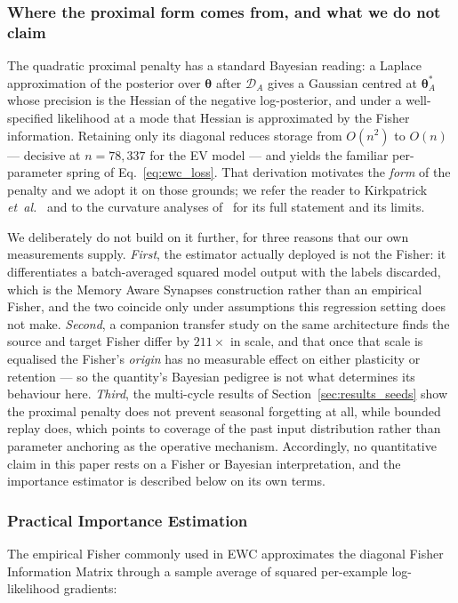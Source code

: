 \documentclass[journal]{IEEEtran}
\newcommand{\params}{\bm{\theta}}
\begin{document}
\subsubsection{Where the proximal form comes from, and what we do not claim}
\label{sec:bayesian}
\label{sec:fisher}
The quadratic proximal penalty has a standard Bayesian reading: a Laplace
approximation of the posterior over $\params$ after $\mathcal{D}_A$ gives a
Gaussian centred at $\params_A^*$ whose precision is the Hessian of the
negative log-posterior, and under a well-specified likelihood at a mode that
Hessian is approximated by the Fisher information. Retaining only its diagonal
reduces storage from $O(n^2)$ to $O(n)$ --- decisive at $n = 78{,}337$ for the
EV model --- and yields the familiar per-parameter spring of
Eq.~\eqref{eq:ewc_loss}. That derivation motivates the \emph{form} of the penalty
and we adopt it on those grounds; we refer the reader to Kirkpatrick
\emph{et~al.}~\cite{kirkpatrick2017overcoming} and to the curvature analyses
of~\cite{kunstner2019limitations} for its full statement and its limits.

We deliberately do not build on it further, for three reasons that our own
measurements supply. \emph{First}, the estimator actually deployed is not the
Fisher: it differentiates a batch-averaged squared model output with the
labels discarded, which is the Memory Aware Synapses construction
\cite{aljundi2018memory} rather than an empirical Fisher, and the two coincide
only under assumptions this regression setting does not make. \emph{Second}, a
companion transfer study on the same architecture
\cite{dabaghia2026representation} finds the source and target
Fisher differ by $211\times$ in scale, and that once that scale is equalised
the Fisher's \emph{origin} has no measurable effect on either plasticity or
retention --- so the quantity's Bayesian pedigree is not what determines its
behaviour here. \emph{Third}, the multi-cycle results of
Section~\ref{sec:results_seeds} show the proximal penalty does not prevent
seasonal forgetting at all, while bounded replay does, which points to
coverage of the past input distribution rather than parameter anchoring as the
operative mechanism. Accordingly, no quantitative claim in this paper rests on
a Fisher or Bayesian interpretation, and the importance estimator is described
below on its own terms.

\subsubsection{Practical Importance Estimation}
\label{sec:practical_fisher}
The empirical Fisher commonly used in EWC approximates the diagonal
Fisher Information Matrix through a sample average of squared
per-example log-likelihood gradients:
\end{document}
